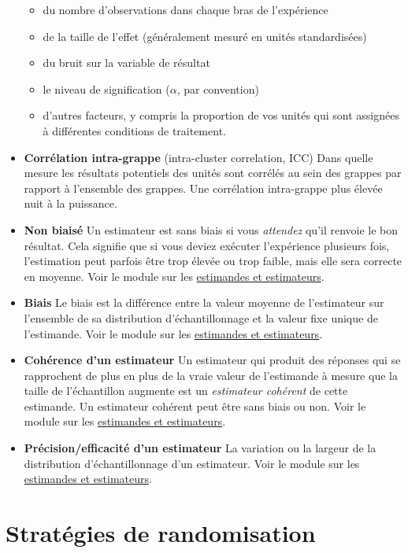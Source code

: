 \documentclass[
  12pt,
]{book}
\providecommand{\tightlist}{%
  \setlength{\itemsep}{0pt}\setlength{\parskip}{0pt}}
\begin{document}
\begin{itemize}
  \begin{itemize}
  \tightlist
  \item
    du nombre d'observations dans chaque bras de l'expérience
  \item
    de la taille de l'effet (généralement mesuré en unités standardisées)
  \item
    du bruit sur la variable de résultat
  \item
    le niveau de signification (\(\alpha\), par convention)
  \item
    d'autres facteurs, y compris la proportion de vos unités qui sont assignées à différentes conditions de traitement.
  \end{itemize}
\item
  \textbf{Corrélation intra-grappe} (intra-cluster correlation, ICC) Dans quelle mesure les résultats potentiels des unités sont corrélés au sein des grappes par rapport à l'ensemble des grappes. Une corrélation intra-grappe plus élevée nuit à la puissance.
\item
  \textbf{Non biaisé} Un estimateur est sans biais si vous \emph{attendez} qu'il renvoie le bon résultat. Cela signifie que si vous deviez exécuter l'expérience plusieurs fois,
  l'estimation peut parfois être trop élevée ou trop faible, mais elle sera correcte en moyenne. Voir le module sur les \href{estimands-and-estimateurs.html}{estimandes et estimateurs}.
\item
  \textbf{Biais} Le biais est la différence entre la valeur moyenne de l'estimateur sur l'ensemble de sa distribution d'échantillonnage et la valeur fixe unique de l'estimande.
  Voir le module sur les \href{estimands-and-estimateurs.html}{estimandes et estimateurs}.
\item
  \textbf{Cohérence d'un estimateur} Un estimateur qui produit des réponses qui se rapprochent de plus en plus de la vraie valeur de l'estimande à mesure que la taille de l'échantillon augmente est un \emph{estimateur cohérent} de cette estimande. Un estimateur cohérent peut être sans biais ou non.
  Voir le module sur les \href{estimands-and-estimateurs.html}{estimandes et estimateurs}.
\item
  \textbf{Précision/efficacité d'un estimateur} La variation ou la largeur de la distribution d'échantillonnage d'un estimateur. Voir le module sur les \href{estimands-and-estimateurs.html}{estimandes et estimateurs}.
\end{itemize}

\hypertarget{stratuxe9gies-de-randomisation}{%
\section{Stratégies de randomisation}\label{stratuxe9gies-de-randomisation}}
\end{document}

